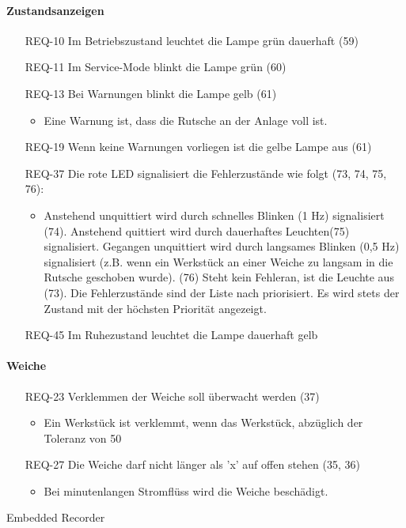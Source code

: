 \paragraph{Zustandsanzeigen}
\begin{itemize}
    \item[REQ-10] Im Betriebszustand leuchtet die Lampe grün dauerhaft (59)
    \item[REQ-11] Im Service-Mode blinkt die Lampe grün (60)
    \item[REQ-13] Bei Warnungen blinkt die Lampe gelb (61)
    \begin{itemize}
        \item Eine Warnung ist, dass die Rutsche an der Anlage voll ist.
    \end{itemize}
    \item[REQ-19] Wenn keine Warnungen vorliegen ist die gelbe Lampe aus (61)
    \item[REQ-37] Die rote LED signalisiert die Fehlerzustände wie folgt (73, 74, 75, 76):
    \begin{itemize}
        \item Anstehend unquittiert wird durch schnelles Blinken (1 Hz) signalisiert (74). Anstehend quittiert wird durch dauerhaftes Leuchten(75) signalisiert. Gegangen unquittiert wird durch langsames Blinken (0,5 Hz) signalisiert (z.B. wenn ein Werkstück an einer Weiche zu langsam in die Rutsche geschoben wurde). (76) Steht kein Fehleran, ist die Leuchte aus (73). Die Fehlerzustände sind der Liste nach priorisiert. Es wird stets der Zustand mit der höchsten Priorität angezeigt.
    \end{itemize}
    \item[REQ-45] Im Ruhezustand leuchtet die Lampe dauerhaft gelb
\end{itemize}

\paragraph{Weiche}
\begin{itemize}
    \item[REQ-23] Verklemmen der Weiche soll überwacht werden (37)
    \begin{itemize}
        \item Ein Werkstück ist verklemmt, wenn das Werkstück, abzüglich der Toleranz von 50%
    \end{itemize}
    \item[REQ-27] Die Weiche darf nicht länger als 'x' auf offen stehen (35, 36)
    \begin{itemize}
        \item Bei minutenlangen Stromflüss wird die Weiche beschädigt.
    \end{itemize}
\end{itemize}
Embedded Recorder
